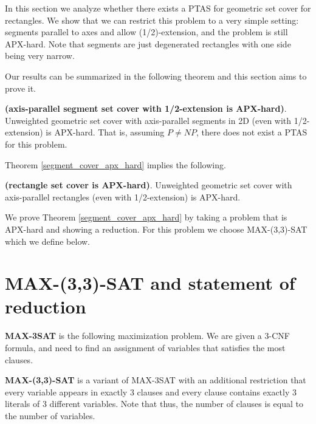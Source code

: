 \label{chapter:segment_apx}

In this section we analyze whether there exists 
a PTAS for geometric set cover for rectangles.
We show that we can restrict this problem
to a very simple setting:
segments parallel to axes and allow (1/2)-extension,
and the problem is still APX-hard.
Note that segments are just degenerated rectangles
with one side being very narrow.


Our results can be summarized in the following
theorem and this section aims to prove it.

\begin{tw}{
\label{segment_cover_apx_hard}
	\textbf{(axis-parallel segment set cover with 1/2-extension is APX-hard)}.	
	Unweighted geometric set cover
	with axis-parallel segments in 2D (even with 1/2-extension)
	is APX-hard.
	That is, assuming $P\neq NP$, there does not exist a PTAS
	for this problem.
}\end{tw}
 
Theorem \ref{segment_cover_apx_hard} implies the following.

\begin{corollary}{
\label{rectangle_cover_apx_hard}
	\textbf{(rectangle set cover is APX-hard)}.	
	Unweighted geometric set cover
	with axis-parallel rectangles (even with 1/2-extension) is APX-hard.
}\end{corollary}


We prove Theorem \ref{segment_cover_apx_hard}
by taking a problem that is APX-hard
and showing a reduction.
For this problem we choose
MAX-(3,3)-SAT which we define below.


\section{MAX-(3,3)-SAT and statement of reduction}
\begin{defi}
\textbf{MAX-3SAT} is the following maximization problem. We are given a 3-CNF
formula, and need to find an assignment of variables
that satisfies the most clauses.
\end{defi}

\begin{defi}
\textbf{MAX-(3,3)-SAT} is a variant of MAX-3SAT with an additional
restriction that every variable appears in exactly 3 clauses
and every clause contains exactly 3 literals of 3 different variables.
Note that thus, the number of clauses is equal to the number of variables.
\end{defi}

